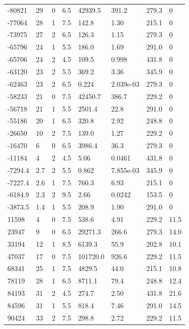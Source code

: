\documentclass[preview]{standalone}
\begin{document}
{{\begin{tabular}{L{1.2cm}C{1.2cm} C{0.3cm}C{0.5cm} C{1.4cm}C{1.4cm} C{1.4cm}C{1.4cm}}
  -80821  &    29  & 0     & 6.5 &  42939.5  & 391.2  & 279.3 &  0   \\ 
  -77064  &    28  & 1     & 7.5 &  142.8  & 1.30  & 215.1 &  0   \\ 
  -73975  &    27  & 2     & 6.5 &  126.3  & 1.15  & 279.3 &  0   \\ 
  -65796  &    24  & 1     & 5.5 &  186.0  & 1.69  & 291.0 &  0   \\ 
  -65706  &    24  & 2     & 4.5 &  109.5  & 0.998  & 431.8 &  0   \\ 
  -63120  &    23  & 2     & 5.5 &  369.2  & 3.36  & 345.9 &  0   \\ 
  -62463  &    23  & 2     & 6.5 &  0.224  & 2.039e-03  & 279.3 &  0   \\ 
  -58233  &    21  & 0     & 7.5 &  42450.7  & 386.7  & 229.2 &  0   \\ 
  -56718  &    21  & 1     & 5.5 &  2501.4  & 22.8  & 291.0 &  0   \\ 
  -55186  &    20  & 1     & 6.5 &  320.8  & 2.92  & 248.8 &  0   \\ 
  -26650  &    10  & 2     & 7.5 &  139.0  & 1.27  & 229.2 &  0   \\ 
  -16470  &     6  & 0     & 6.5 &  3986.4  & 36.3  & 279.3 &  0   \\ 
  -11184  &     4  & 2     & 4.5 &  5.06  & 0.0461  & 431.8 &  0   \\ 
  -7294.4  &   2.7  & 2     & 5.5 &  0.862  & 7.855e-03  & 345.9 &  0   \\ 
  -7227.4  &   2.6  & 1     & 7.5 &  760.3  & 6.93  & 215.1 &  0   \\ 
  -6184.9  &   2.3  & 2     & 9.5 &  2.66  & 0.0242  & 153.5 &  0   \\ 
  -3873.5  &   1.4  & 1     & 5.5 &  208.9  & 1.90  & 291.0 &  0   \\ 
  11598  &     4  & 0     & 7.5 &  538.6  & 4.91  & 229.2 &  11.5   \\ 
  23947  &     9  & 0     & 6.5 &  29271.3  & 266.6  & 279.3 &  14.0   \\ 
  33194  &    12  & 1     & 8.5 &  6139.3  & 55.9  & 202.8 &  10.1   \\ 
  47037  &    17  & 0     & 7.5 &  101720.0  & 926.6  & 229.2 &  11.5   \\ 
  68341  &    25  & 1     & 7.5 &  4829.5  & 44.0  & 215.1 &  10.8   \\ 
  78119  &    28  & 1     & 6.5 &  8711.1  & 79.4  & 248.8 &  12.4   \\ 
  84193  &    31  & 2     & 4.5 &  274.7  & 2.50  & 431.8 &  21.6   \\ 
  84596  &    31  & 1     & 5.5 &  818.4  & 7.46  & 291.0 &  14.5   \\ 
  90424  &    33  & 2     & 7.5 &  298.8  & 2.72  & 229.2 &  11.5   \\ 
\hline 
\end{tabular} 

}}
\end{document}
